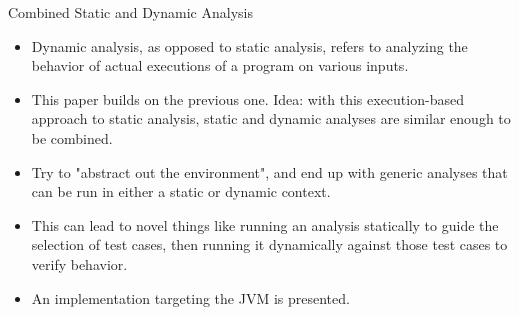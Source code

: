 \documentclass{beamer}
\begin{document}
\begin{frame}{Combined Static and Dynamic Analysis}
\begin{itemize}
\item Dynamic analysis, as opposed to static analysis, refers to analyzing
the behavior of actual executions of a program on various inputs.
\item This paper builds on the previous one. Idea: with this execution-based
approach to static analysis, static and dynamic analyses are similar enough
to be combined.
\item Try to "abstract out the environment", and end up with generic
analyses that can be run in either a static or dynamic context.
\item This can lead to novel things like running an analysis statically to
guide the selection of test cases, then running it dynamically against
those test cases to verify behavior.
\item An implementation targeting the JVM is presented.
\end{itemize}
\end{frame}
\end{document}
